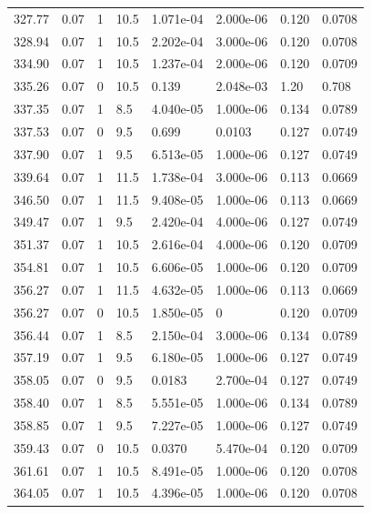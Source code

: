 \documentclass[preview]{standalone}
\begin{document}
{{{\begin{tabular}{L{1.2cm}C{1.2cm} C{0.3cm}C{0.5cm} C{1.4cm}C{1.4cm} C{1.4cm}C{1.4cm}}
  327.77  &  0.07  & 1     & 10.5 &  1.071e-04  & 2.000e-06  & 0.120 &  0.0708   \\ 
  328.94  &  0.07  & 1     & 10.5 &  2.202e-04  & 3.000e-06  & 0.120 &  0.0708   \\ 
  334.90  &  0.07  & 1     & 10.5 &  1.237e-04  & 2.000e-06  & 0.120 &  0.0709   \\ 
  335.26  &  0.07  & 0     & 10.5 &  0.139  & 2.048e-03  & 1.20 &  0.708   \\ 
  337.35  &  0.07  & 1     & 8.5 &  4.040e-05  & 1.000e-06  & 0.134 &  0.0789   \\ 
  337.53  &  0.07  & 0     & 9.5 &  0.699  & 0.0103  & 0.127 &  0.0749   \\ 
  337.90  &  0.07  & 1     & 9.5 &  6.513e-05  & 1.000e-06  & 0.127 &  0.0749   \\ 
  339.64  &  0.07  & 1     & 11.5 &  1.738e-04  & 3.000e-06  & 0.113 &  0.0669   \\ 
  346.50  &  0.07  & 1     & 11.5 &  9.408e-05  & 1.000e-06  & 0.113 &  0.0669   \\ 
  349.47  &  0.07  & 1     & 9.5 &  2.420e-04  & 4.000e-06  & 0.127 &  0.0749   \\ 
  351.37  &  0.07  & 1     & 10.5 &  2.616e-04  & 4.000e-06  & 0.120 &  0.0709   \\ 
  354.81  &  0.07  & 1     & 10.5 &  6.606e-05  & 1.000e-06  & 0.120 &  0.0709   \\ 
  356.27  &  0.07  & 1     & 11.5 &  4.632e-05  & 1.000e-06  & 0.113 &  0.0669   \\ 
  356.27  &  0.07  & 0     & 10.5 &  1.850e-05  & 0  & 0.120 &  0.0709   \\ 
  356.44  &  0.07  & 1     & 8.5 &  2.150e-04  & 3.000e-06  & 0.134 &  0.0789   \\ 
  357.19  &  0.07  & 1     & 9.5 &  6.180e-05  & 1.000e-06  & 0.127 &  0.0749   \\ 
  358.05  &  0.07  & 0     & 9.5 &  0.0183  & 2.700e-04  & 0.127 &  0.0749   \\ 
  358.40  &  0.07  & 1     & 8.5 &  5.551e-05  & 1.000e-06  & 0.134 &  0.0789   \\ 
  358.85  &  0.07  & 1     & 9.5 &  7.227e-05  & 1.000e-06  & 0.127 &  0.0749   \\ 
  359.43  &  0.07  & 0     & 10.5 &  0.0370  & 5.470e-04  & 0.120 &  0.0709   \\ 
  361.61  &  0.07  & 1     & 10.5 &  8.491e-05  & 1.000e-06  & 0.120 &  0.0708   \\ 
  364.05  &  0.07  & 1     & 10.5 &  4.396e-05  & 1.000e-06  & 0.120 &  0.0708   \\ 

\end{tabular}}}}
\end{document}

